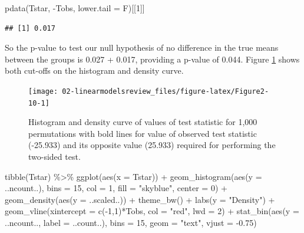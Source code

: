 \documentclass[
]{book}
\newenvironment{Shaded}{\begin{snugshade}}{\end{snugshade}}
\newcommand{\AttributeTok}[1]{\textcolor[rgb]{0.77,0.63,0.00}{#1}}
\newcommand{\DecValTok}[1]{\textcolor[rgb]{0.00,0.00,0.81}{#1}}
\newcommand{\FloatTok}[1]{\textcolor[rgb]{0.00,0.00,0.81}{#1}}
\newcommand{\FunctionTok}[1]{\textcolor[rgb]{0.00,0.00,0.00}{#1}}
\newcommand{\NormalTok}[1]{#1}
\newcommand{\SpecialCharTok}[1]{\textcolor[rgb]{0.00,0.00,0.00}{#1}}
\newcommand{\StringTok}[1]{\textcolor[rgb]{0.31,0.60,0.02}{#1}}
\begin{document}
\begin{Shaded}
\begin{Highlighting}[]
\FunctionTok{pdata}\NormalTok{(Tstar, }\SpecialCharTok{{-}}\NormalTok{Tobs, }\AttributeTok{lower.tail =}\NormalTok{ F)[[}\DecValTok{1}\NormalTok{]]}
\end{Highlighting}
\end{Shaded}

\begin{verbatim}
## [1] 0.017
\end{verbatim}

So the p-value to test our null hypothesis of no difference in the true means
between the groups is 0.027 + 0.017, providing a p-value of 0.044.
Figure \ref{fig:Figure2-10} shows both cut-offs on the histogram and density curve.



\begin{figure}[ht!]

{\centering \texttt{[image: 02-linearmodelsreview\_files/figure-latex/Figure2-10-1]} 

}

\caption{Histogram and density curve of values of test statistic for 1,000 permutations with bold lines for value of observed test statistic (-25.933) and its opposite value (25.933) required for performing the two-sided test.}\label{fig:Figure2-10}
\end{figure}

\begin{Shaded}
\begin{Highlighting}[]
\FunctionTok{tibble}\NormalTok{(Tstar) }\SpecialCharTok{\%\textgreater{}\%} \FunctionTok{ggplot}\NormalTok{(}\FunctionTok{aes}\NormalTok{(}\AttributeTok{x =}\NormalTok{ Tstar)) }\SpecialCharTok{+} 
  \FunctionTok{geom\_histogram}\NormalTok{(}\FunctionTok{aes}\NormalTok{(}\AttributeTok{y =}\NormalTok{ ..ncount..), }\AttributeTok{bins =} \DecValTok{15}\NormalTok{, }\AttributeTok{col =} \DecValTok{1}\NormalTok{, }\AttributeTok{fill =} \StringTok{"skyblue"}\NormalTok{, }\AttributeTok{center =} \DecValTok{0}\NormalTok{) }\SpecialCharTok{+} 
  \FunctionTok{geom\_density}\NormalTok{(}\FunctionTok{aes}\NormalTok{(}\AttributeTok{y =}\NormalTok{ ..scaled..)) }\SpecialCharTok{+}
  \FunctionTok{theme\_bw}\NormalTok{() }\SpecialCharTok{+}
  \FunctionTok{labs}\NormalTok{(}\AttributeTok{y =} \StringTok{"Density"}\NormalTok{) }\SpecialCharTok{+}
  \FunctionTok{geom\_vline}\NormalTok{(}\AttributeTok{xintercept =} \FunctionTok{c}\NormalTok{(}\SpecialCharTok{{-}}\DecValTok{1}\NormalTok{,}\DecValTok{1}\NormalTok{)}\SpecialCharTok{*}\NormalTok{Tobs, }\AttributeTok{col =} \StringTok{"red"}\NormalTok{, }\AttributeTok{lwd =} \DecValTok{2}\NormalTok{) }\SpecialCharTok{+}
  \FunctionTok{stat\_bin}\NormalTok{(}\FunctionTok{aes}\NormalTok{(}\AttributeTok{y =}\NormalTok{ ..ncount.., }\AttributeTok{label =}\NormalTok{ ..count..), }\AttributeTok{bins =} \DecValTok{15}\NormalTok{, }
           \AttributeTok{geom =} \StringTok{"text"}\NormalTok{, }\AttributeTok{vjust =} \SpecialCharTok{{-}}\FloatTok{0.75}\NormalTok{)}
\end{Highlighting}
\end{Shaded}
\end{document}
